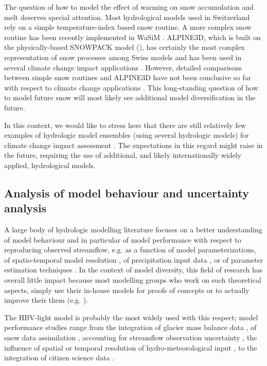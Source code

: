\documentclass[10pt,a4paper]{article}
\begin{document}
The question of how to model the effect of warming on snow accumulation and melt deserves special attention. Most hydrological models used in Switzerland rely on a simple temperature-index based snow routine. A more complex snow routine has been recently implemented in  WaSiM \citep{Thornton2021}. ALPINE3D, which is built on the physically-based SNOWPACK model (\citealt{Lehning2002,Bartelt_2002,Bartelt2002,Lehning_2002}),  has certainly the most complex representation of snow processes among Swiss  models and has been used in several climate change impact applications \citep{Bavay2009,Bavay2013,Marty2017}. However, detailed comparisons between simple snow routines and ALPINE3D have not been conclusive so far with respect to climate change applications \citep{Kobierska2011,Shakoor2018}. This long-standing question of how to model future snow will most likely see additional model diversification in the future. 

In this context, we would like to stress here that there are still relatively few examples of hydrologic model ensembles (using several hydrologic models) for climate change impact assessment \citep{Kobierska2011,Addor2014}. The expectations in this regard might raise in the future, requiring the use of additional, and likely internationally widely applied, hydrological models.


\subsection{Analysis of model behaviour and uncertainty analysis}
\label{sec:application:uncertainty}

A large body of hydrologic modelling literature focuses on a better understanding of model behaviour and in particular of model performance with respect to reproducing observed streamflow, e.g. as a function of model parameterizations, of spatio-temporal model resolution \citep{Brunner_2019}, of precipitation input data \citep{Sikorska2016,Muller-Thomy2019},  or of parameter estimation techniques \citep{Foglia_2009}. In the context of model diversity, this field of research has overall little impact because most modelling groups who work on such theoretical aspects, simply use their in-house models for proofs of concepts or to actually improve their them (e.g. \citealt{Schaefli2007,Hingray2010}).

The HBV-light model is probably the most widely used with this respect; model performance studies range from the integration of glacier mass balance data \citep{Finger2015,schaeflihuss11}, of snow data assimilation \citep{Griessinger2016}, accounting for streamflow observation uncertainty \citep{Westerberg2020}, the influence of spatial or temporal resolution of hydro-meteorological input \citep{GironsLopez2016,Sikorska2018}, to the integration of citizen science data \citep{Etter2020}.
\end{document}
